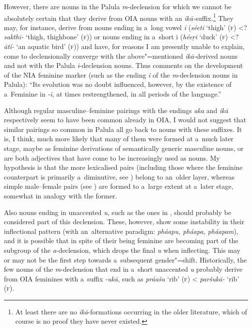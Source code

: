 However, there are nouns in the Palula \textit{m}-declension for which we cannot be absolutely
certain that they derive from OIA nouns with an \textit{ikā-}suffix.\footnote{At least there are
  no \textit{ikā}-formations occurring in the older literature, which of course is no proof
  they have never existed.} They may, for instance, derive from nouns ending in a~long vowel
\textit{ī} (\textit{séeti} `thigh' (\textsc{f}) {\textless}? \textit{sakthī-} `thigh, thighbone' (\textsc{f})) or nouns ending in a~short i (\textit{héeṛi} `duck'
(\textsc{f}) {\textless}? \textit{ātí-} `an aquatic bird' (\textsc{f})) and have, for
reasons I am presently unable to explain, come to declensionally converge with the above"=mentioned
\textit{ikā-}derived nouns and not with the Palula \textit{i}-declension nouns. Thus
\citet[222]{masica1991} comments on the development of the NIA feminine marker (such as the ending
\textit{i} of the \textit{m}-declension nouns in Palula): ``Its evolution was no doubt influenced,
however, by the existence of a~Feminine in \textit{-ī}, at times
restrengthened, in all periods of the language.''


Although regular masculine--feminine pairings with the endings \textit{aka} and \textit{ikā}
respectively seem to have been common already in OIA, I would not suggest that similar pairings so
common in Palula all go back to nouns with these suffixes. It is, I think, much more likely that
many of them were formed at a~much later stage, maybe as feminine derivations of semantically
generic masculine nouns, or are both adjectives that have come to be increasingly used as nouns. My
hypothesis is that the more lexicalised pairs (including those where the feminine counterpart is
primarily a~diminutive, see ) belong to an~older layer, whereas simple
male--female pairs (see ) are formed to a~large extent at a~later stage, somewhat in
analogy with the former.


Also nouns ending in unaccented \textit{u}, such as the ones in , should probably be considered part of this declension. These, however, show some instability in their inflectional pattern (with an~alternative paradigm: \textit{pháapu, pháapa, pháapam}), and it is possible that in spite of their being feminine are becoming part of the subgroup of the \textit{a}-declension, which drops the final \textit{u} when inflecting. This may or may not be the first step towards a~subsequent gender"=shift. Historically, the few nouns of the \textit{m}-declension that end in a~short unaccented \textit{u} probably derive from OIA feminines with a~suffix \textit{-ukā}, such as \textit{práašu} `rib' (\textsc{f}) {\textless} \textit{paršukā-} `rib' (\textsc{f}).


